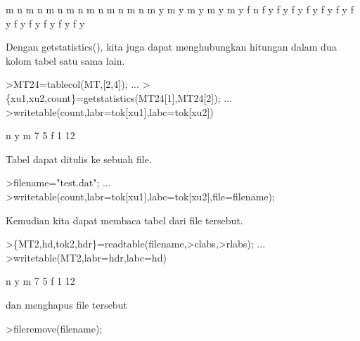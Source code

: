 \documentclass[12pt,Times new roman,letterpaper]{book}
\begin{document}
\begin{eulernootebook}
\begin{eulercomment}
\begin{eulercomment}
\begin{eulernootebook}
\begin{eulercomment}
\begin{eulercomment}
\begin{eulercomment}
\begin{eulercomment}
\begin{eulercomment}
\begin{eulercomment}
\begin{eulercomment}
\begin{euleroutput}
           m         n
           m         n
           m         n
           m         n
           m         n
           m         n
           m         n
           m         y
           m         y
           m         y
           m         y
           m         y
           f         n
           f         y
           f         y
           f         y
           f         y
           f         y
           f         y
           f         y
           f         y
           f         y
           f         y
           f         y
           f         y
\end{euleroutput}
\begin{eulercomment}
Dengan getstatistics(), kita juga dapat menghubungkan hitungan dalam
dua kolom tabel satu sama lain.
\end{eulercomment}
\begin{eulerprompt}
>MT24=tablecol(MT,[2,4]); ...
>\{xu1,xu2,count\}=getstatistics(MT24[1],MT24[2]); ...
>writetable(count,labr=tok[xu1],labc=tok[xu2])
\end{eulerprompt}
\begin{euleroutput}
                     n         y
           m         7         5
           f         1        12
\end{euleroutput}
\begin{eulercomment}
Tabel dapat ditulis ke sebuah file.
\end{eulercomment}
\begin{eulerprompt}
>filename="test.dat"; ...
>writetable(count,labr=tok[xu1],labc=tok[xu2],file=filename);
\end{eulerprompt}
\begin{eulercomment}
Kemudian kita dapat membaca tabel dari file tersebut.
\end{eulercomment}
\begin{eulerprompt}
>\{MT2,hd,tok2,hdr\}=readtable(filename,>clabs,>rlabs); ...
>writetable(MT2,labr=hdr,labc=hd)
\end{eulerprompt}
\begin{euleroutput}
                     n         y
           m         7         5
           f         1        12
\end{euleroutput}
\begin{eulercomment}
dan menghapus file tersebut
\end{eulercomment}
\begin{eulerprompt}
>fileremove(filename);
\end{eulerprompt}

\end{eulercomment}
\end{eulercomment}
\end{eulercomment}
\end{eulercomment}
\end{eulercomment}
\end{eulercomment}
\end{eulercomment}
\end{eulernootebook}
\end{eulercomment}
\end{eulercomment}
\end{eulernootebook}
\end{document}
